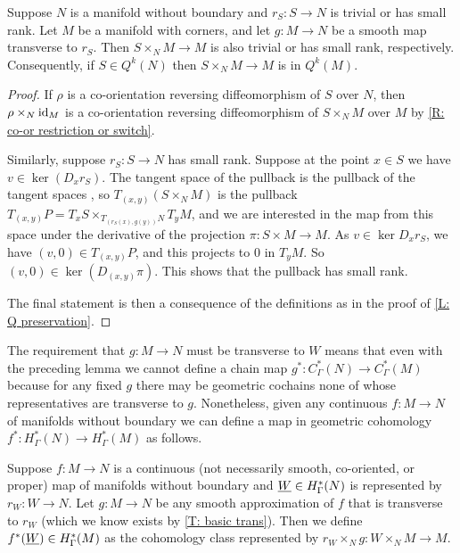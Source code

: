 \begin{lemma}\label{L: pullback map Q}
	Suppose $N$ is a manifold without boundary and $r_S \colon S \to N$ is trivial or has small rank.
	Let $M$ be a manifold with corners, and let $g \colon M \to N$ be a smooth map transverse to $r_S$.
	Then $S \times_N M \to M$ is also trivial or has small rank, respectively.
	Consequently, if $S \in Q^k(N)$ then $S \times_N M \to M$ is in $Q^k(M)$.
\end{lemma}

\begin{proof}
	If $\rho$ is a co-orientation reversing diffeomorphism of $S$ over $N$, then $\rho \times_N \mathrm{id}_M$ is a co-orientation reversing diffeomorphism of $S \times_N M$ over $M$ by \cref{R: co-or restriction or switch}.

	Similarly, suppose $r_S \colon S \to N$ has small rank.
	Suppose at the point $x \in S$ we have $v \in \ker(D_x r_S)$.
	The tangent space of the pullback is the pullback of the tangent spaces \cite[Theorem 5.47]{Wed16}, so $T_{(x,y)}(S \times_N M)$ is the pullback $T_{(x,y)}P = T_xS\times_{T_{(r_S(x),g(y))}N} T_y M$, and we are interested in the map from this space under the derivative of the projection $\pi \colon S \times M \to M$.
	As $v \in \ker D_xr_S$, we have $(v,0) \in T_{(x,y)}P$, and this projects to $0$ in $T_yM$.
	So $(v,0) \in \ker(D_{(x,y)}\pi)$.
	This shows that the pullback has small rank.

	The final statement is then a consequence of the definitions as in the proof of \cref{L: Q preservation}.
\end{proof}

The requirement that $g \colon M \to N$ must be transverse to $W$ means that even with the preceding lemma we cannot define a chain map $g^*:C^*_\Gamma(N) \to C^*_\Gamma(M)$ because for any fixed $g$ there may be geometric cochains none of whose representatives are transverse to $g$.
Nonetheless, given any continuous $f \colon M \to N$ of manifolds without boundary we can define a map in geometric cohomology $f^* \colon H^*_\Gamma(N) \to H^*_\Gamma(M)$ as follows.

\begin{definition}
	Suppose $f \colon M \to N$ is a continuous (not necessarily smooth, co-oriented, or proper) map of manifolds without boundary and $\underline{W} \in H^*_\Gamma(N)$ is represented by $r_W \colon W \to N$.
	Let $g \colon M \to N$ be any smooth approximation of $f$ that is transverse to $r_W$ (which we know exists by \cref{T: basic trans}).
	Then we define $f^*(\underline{W}) \in H^*_\Gamma(M)$ as the cohomology class represented by $r_W \times_N g \colon W \times_N M \to M$.
\end{definition}

